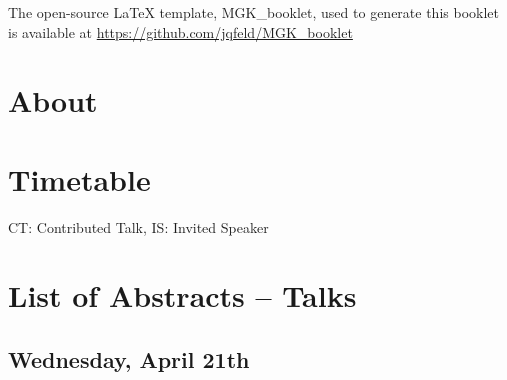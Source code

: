 \documentclass[openany, parskip=full, 12pt, a4, DIV=16]{scrbook}
\begin{document}
	
	
\mbox{}
\thispagestyle{empty}
\vfill
\begin{center}
    The open-source LaTeX template, MGK\_booklet, used to generate this booklet is available at \url{https://github.com/jqfeld/MGK\_booklet}
\end{center}

\newpage

\tableofcontents

\chapter{About}



\chapter{Timetable}

CT: Contributed Talk, IS: Invited Speaker

\chapter{List of Abstracts -- Talks}

\section{Wednesday, April 21th}








 



\end{document}
